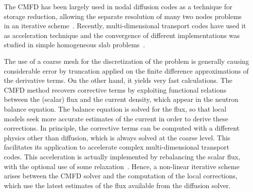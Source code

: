 \documentclass[letterpaper]{physor2020}
\begin{document}


The CMFD has been largely used in nodal diffusion codes as a technique for storage reduction, allowing the separate resolution of many two nodes problems in an iterative scheme~\cite{Smith-1983,Lawrence-1986}. Recently, multi-dimensional transport codes have used it as acceleration technique and the convergence of different implementations was studied in simple homogeneous slab problems~\cite{Jarrett-2016,Shen-2019}.

The use of a coarse mesh for the discretization of the problem is generally causing considerable error by truncation applied on the finite difference approximations of the derivative terms. On the other hand, it yields very fast calculations. The CMFD method recovers corrective terms by exploiting functional relations between the (scalar) flux and the current density, which appear in the neutron balance equation. The balance equation is solved for the flux, so that local models seek more accurate estimates of the current in order to derive these corrections. In principle, the corrective terms can be computed with a different physics other than diffusion, which is always solved at the coarse level. This facilitates its application to accelerate complex multi-dimensional transport codes. This acceleration is actually implemented by rebalancing the scalar flux, with the optional use of some relaxation~\cite{Park-2017}. Hence, a non-linear iterative scheme arises between the CMFD solver and the computation of the local corrections, which use the latest estimates of the flux available from the diffusion solver.
\end{document}

